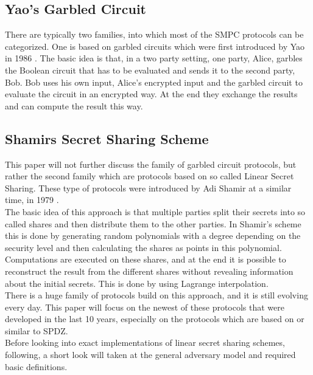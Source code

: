\documentclass[english,runningheads,a4paper]{llncs}[2018/03/10]
\begin{document}
\subsection{Yao's Garbled Circuit}
There are typically two families, into which most of the SMPC protocols can be categorized. One is based on garbled circuits which were first introduced by Yao in 1986 \cite{4568207}. The basic idea is that, in a two party setting, one party, Alice, garbles the Boolean circuit that has to be evaluated and sends it to the second party, Bob. Bob uses his own input, Alice's encrypted input and the garbled circuit to evaluate the circuit in an encrypted way. At the end they exchange the results and can compute the result this way. 

\subsection{Shamirs Secret Sharing Scheme}
This paper will not further discuss the family of garbled circuit protocols, but rather the second family which are protocols based on so called Linear Secret Sharing. 
These type of protocols were introduced by Adi Shamir at a similar time, in 1979 \cite{Shamir:1979:SS:359168.359176}.\\
The basic idea of this approach is that multiple parties split their secrets into so called shares and then distribute them to the other parties. In Shamir's scheme this is done by generating random polynomials with a degree depending on the security level and then calculating the shares as points in this polynomial. Computations are executed on these shares, and at the end it is possible to reconstruct the result from the different shares without revealing information about the initial secrets. This is done by using Lagrange interpolation.\\
There is a huge family of protocols build on this approach, and it is still evolving every day. This paper will focus on the newest of these protocols that were developed in the last 10 years, especially on the protocols which are based on or similar to SPDZ.\\

Before looking into exact implementations of linear secret sharing schemes, following, a short look will taken at the general adversary model and required basic definitions.
\end{document}
